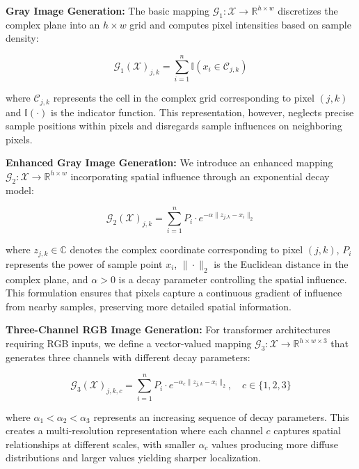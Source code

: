 \textbf{Gray Image Generation:} The basic mapping $\mathcal{G}_1: \mathcal{X} \rightarrow \mathbb{R}^{h \times w}$ discretizes the complex plane into an $h \times w$ grid and computes pixel intensities based on sample density:

\begin{equation}
\mathcal{G}_1(\mathcal{X})_{j,k} = \sum_{i=1}^n \mathbb{I}(x_i \in \mathcal{C}_{j,k})
\end{equation}

where $\mathcal{C}_{j,k}$ represents the cell in the complex grid corresponding to pixel $(j,k)$ and $\mathbb{I}(\cdot)$ is the indicator function. This representation, however, neglects precise sample positions within pixels and disregards sample influences on neighboring pixels.

\textbf{Enhanced Gray Image Generation:} We introduce an enhanced mapping $\mathcal{G}_2: \mathcal{X} \rightarrow \mathbb{R}^{h \times w}$ incorporating spatial influence through an exponential decay model:

\begin{equation}
\mathcal{G}_2(\mathcal{X})_{j,k} = \sum_{i=1}^n P_i \cdot e^{-\alpha \|z_{j,k} - x_i\|_2}
\end{equation}

where $z_{j,k} \in \mathbb{C}$ denotes the complex coordinate corresponding to pixel $(j,k)$, $P_i$ represents the power of sample point $x_i$, $\|\cdot\|_2$ is the Euclidean distance in the complex plane, and $\alpha > 0$ is a decay parameter controlling the spatial influence. This formulation ensures that pixels capture a continuous gradient of influence from nearby samples, preserving more detailed spatial information.

\textbf{Three-Channel RGB Image Generation:} For transformer architectures requiring RGB inputs, we define a vector-valued mapping $\mathcal{G}_3: \mathcal{X} \rightarrow \mathbb{R}^{h \times w \times 3}$ that generates three channels with different decay parameters:

\begin{equation}
\mathcal{G}_3(\mathcal{X})_{j,k,c} = \sum_{i=1}^n P_i \cdot e^{-\alpha_c \|z_{j,k} - x_i\|_2}, \quad c \in \{1,2,3\}
\end{equation}

where $\alpha_1 < \alpha_2 < \alpha_3$ represents an increasing sequence of decay parameters. This creates a multi-resolution representation where each channel $c$ captures spatial relationships at different scales, with smaller $\alpha_c$ values producing more diffuse distributions and larger values yielding sharper localization.

